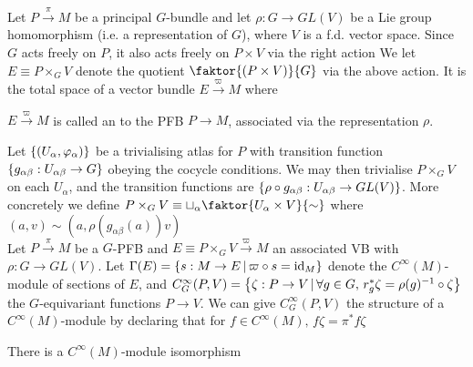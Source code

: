 \documentclass{article}
\begin{document}
Let $P\overset{\pi}{\to}M$ be a principal $G$-bundle and let $\rho: G \to GL(V)$ be a Lie group homomorphism (i.e. a representation of $G$), where $V$ is a f.d. vector space. Since $G$ acts freely on $P$, it also acts freely on $P\times V$ via the right action 
We let $E \equiv P \times_G V$ denote the quotient $\faktor{(P\times V)}{G}$ via the above action. It is the total space of a vector bundle $E\overset{\varpi}{\to}M$ where 
\begin{definition}
$E\overset{\varpi}{\to}M$ is called an  to the PFB $P \to M$, associated via the representation $\rho$. 
\end{definition}
Let $\left\{ (U_\alpha,\varphi_\alpha) \right\}$ be a trivialising atlas for $P$ with transition function $\left\{ g_{\alpha\beta}:U_{\alpha\beta} \to G \right\}$ obeying the cocycle conditions. We may then trivialise $P\times_G V$ on each $U_\alpha$, and the transition functions are $\left\{ \rho \circ g_{\alpha\beta}:U_{\alpha\beta}\to GL(V) \right\}$. More concretely we define $P \times_G V \equiv \sqcup_\alpha \faktor{U_\alpha \times V}{\sim}$ where $(a,v) \sim (a,\rho(g_{\alpha\beta}(a))v)$ \\
Let $P\overset{\pi}{\to} M$ be a $G$-PFB and $E\equiv P \times_G V \overset{\varpi}{\to} M$ an associated VB with $\rho: G \to GL(V)$. Let $\Gamma(E) = \left\{ s:M \to E \, | \, \varpi \circ s = \operatorname{id}_M \right\}$ denote the $C^\infty(M)$-module of sections of $E$, and $C^\infty_G(P,V) = \left\{ \zeta : P \to V \, | \, \forall g \in G, \, r_g^\ast \zeta = \rho(g)^{-1} \circ \zeta  \right\}$ the $G$-equivariant functions $P \to V$. We can give $C^\infty_G(P,V)$ the structure of a $C^\infty(M)$-module by declaring that for $f \in C^\infty(M), \, f \zeta = \pi^\ast f \zeta$ 
\begin{prop}
There is a $C^\infty(M)$-module isomorphism 
\end{prop}
\end{document}

